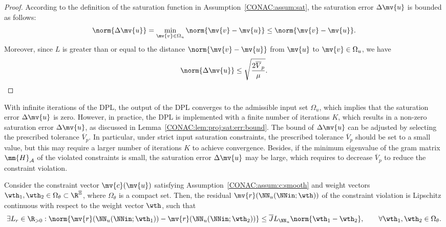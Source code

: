 \begin{proof}
  According to the definition of the saturation function in Assumption~\ref{CONAC:assum:sat}, the saturation error $\Delta\mv{u}$ is bounded as follows:
  \begin{equation}
    \norm{\Delta\mv{u}}
    =
    \min_{\mv{v}\in\Omega_u}
    \norm{\mv{v} - \mv{u}}
    \le
    \norm{\mv{v} - \mv{u}}
    .
  \end{equation}
  Moreover, since $L$ is greater than or equal to the distance $\norm{\mv{v} - \mv{u}}$ from $\mv{u}$ to $\mv{v}\in\Omega_u$, we have
  \begin{equation}
    \norm{\Delta\mv{u}}
    \le
    \sqrt{\frac{2 \overline{V}_p}{\mu}}
    .
  \end{equation}

\end{proof}

\begin{remark}
  With infinite iterations of the DPL, the output of the DPL converges to the admissible input set $\Omega_u$, which implies that the saturation error $\Delta\mv{u}$ is zero.
  However, in practice, the DPL is implemented with a finite number of iterations $K$, which results in a non-zero saturation error $\Delta\mv{u}$, as discussed in Lemma~\ref{CONAC:lem:proj:sat:err:bound}.
  The bound of $\Delta\mv{u}$ can be adjusted by selecting the prescribed tolerance $\overline{V}_p$.
  In particular, under strict input saturation constraints, the prescribed tolerance $\overline{V}_p$ should be set to a small value, but this may require a larger number of iterations $K$ to achieve convergence.
  Besides, if the minimum eigenvalue of the gram matrix $\mm{H}_\mathcal{A}$ of the violated constraints is small, the saturation error $\Delta\mv{u}$ may be large, which requires to decrease $\overline{V}_p$ to reduce the constraint violation.
\end{remark}

\begin{lem}
  \label{CONAC:lem:residual:Lipschitz}
  Consider the constraint vector $\mv{c}(\mv{u})$ satisfying Assumption~\ref{CONAC:assum:c:smooth} and weight vectors $\wth_1,\wth_2\in\Omega_{\theta}\subset\R^\Xi$, where $\Omega_{\theta}$ is a compact set.
  Then, the residual $\mv{r}(\NN_u(\NNin;\wth))$ of the constraint violation is Lipschitz continuous with respect to the weight vector $\wth$, such that
  \begin{equation}
    \exists L_r\in\R_{>0}
    :
    \norm{\mv{r}(\NN_u(\NNin;\wth_1))-\mv{r}(\NN_u(\NNin;\wth_2))}
    \le
    \overline{J}
    L_{\NN_u}
    \norm{\wth_1-\wth_2}
    ,
    \qquad
    \forall \wth_1,\wth_2\in\Omega_{\theta}
    .
  \end{equation} 
\end{lem}


